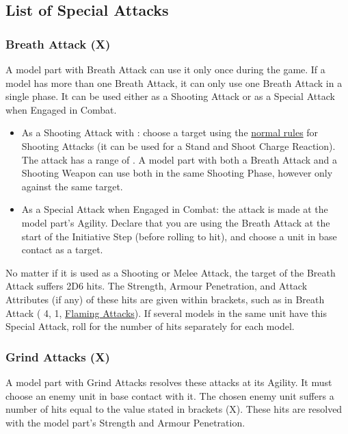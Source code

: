 \subsection{List of Special Attacks}

\subsubsection{Breath Attack (X)}
\idx[main=y]{\breathattack{}}\label{breath_attack}

A model part with Breath Attack can use it only once during the game. If a model has more than one Breath Attack, it can only use one Breath Attack in a single phase. It can be used either as a Shooting Attack or as a Special Attack when Engaged in Combat.
\begin{itemize}
\item As a Shooting Attack with \textbf{\marchandshoot}: choose a target using the \hyperref[shooting_with_a_unit]{normal rules} for Shooting Attacks (it can be used for a Stand and Shoot Charge Reaction). The attack has a range of . A model part with both a Breath Attack and a Shooting Weapon can use both in the same Shooting Phase, however only against the same target.
\item As a Special Attack when Engaged in Combat: the attack is made at the model part's Agility. Declare that you are using the Breath Attack at the start of the Initiative Step (before rolling to hit), and choose a unit in base contact as a target.
\end{itemize}
No matter if it is used as a Shooting or Melee Attack, the target of the Breath Attack suffers 2D6 hits. The Strength, Armour Penetration, and Attack Attributes (if any) of these hits are given within brackets, such as in Breath Attack (\St{} 4, \AP{} 1, \hyperref[flaming_attacks]{Flaming Attacks}). If several models in the same unit have this Special Attack, roll for the number of hits separately for each model.

\newpage
\subsubsection{Grind Attacks (X)}
\idx[main=y]{\grindattacks{}}\label{grind_attacks}

A model part with Grind Attacks resolves these attacks at its Agility. It must choose an enemy unit in base contact with it. The chosen enemy unit suffers a number of hits equal to the value stated in brackets (X). These hits are resolved with the model part's Strength and Armour Penetration.

